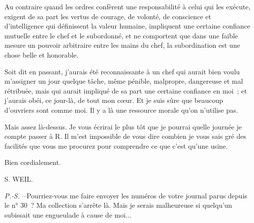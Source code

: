 \documentclass[french,twoside]{book} %
\begin{document}
Au contraire quand les ordres confèrent une responsabilité à celui qui les exécute, exigent de sa part les vertus de courage, de volonté, de conscience et d'intelligence qui définissent la valeur humaine, impliquent une certaine confiance mutuelle entre le chef et le subordonné, et ne comportent que dans une faible mesure un pouvoir arbitraire entre les mains du chef, la subordination est une chose belle et honorable.\par
Soit dit en passant, j'aurais été reconnaissante à un chef qui aurait bien voulu m'assigner un jour quelque tâche, même pénible, malpropre, dangereuse et mal rétribuée, mais qui aurait impliqué de sa part une certaine confiance en moi ; et j’aurais obéi, ce jour-là, de tout mon cœur. Et je suis sûre que beaucoup d'ouvriers sont comme moi. Il y a là une ressource morale qu'on n'utilise pas.\par
Mais assez là-dessus. Je vous écrirai le plus tôt que je pourrai quelle journée je compte passer à R. Il m'est impossible de vous dire combien je vous sais gré des facilités que vous me procurez pour comprendre ce que c'est qu'une usine.\par
Bien cordialement.\par
S. WEIL.\par
{\itshape P.-S.} –Pourriez-vous me faire envoyer les numéros de votre journal parus depuis le n° 30 ? Ma collection s'arrête là. Mais je serais malheureuse si quelqu'un subissait une engueulade à cause de moi...\par
\end{document}
